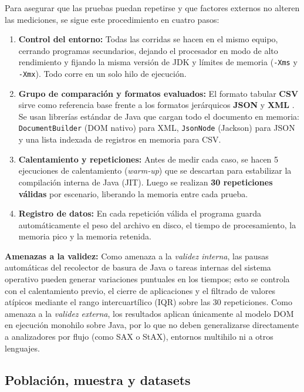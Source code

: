 Para asegurar que las pruebas puedan repetirse y que factores externos no alteren las mediciones, se sigue este procedimiento en cuatro pasos:

\begin{enumerate}
    \item \textbf{Control del entorno:} Todas las corridas se hacen en el mismo equipo, cerrando programas secundarios, dejando el procesador en modo de alto rendimiento y fijando la misma versión de JDK y límites de memoria (\texttt{-Xms} y \texttt{-Xmx}). Todo corre en un solo hilo de ejecución.
    \item \textbf{Grupo de comparación y formatos evaluados:} El formato tabular \textbf{CSV} \cite{shafranovich2005} sirve como referencia base frente a los formatos jerárquicos \textbf{JSON} \cite{bray2017} y \textbf{XML} \cite{bray1998}. Se usan librerías estándar de Java que cargan todo el documento en memoria: \texttt{DocumentBuilder} (DOM nativo) para XML, \texttt{JsonNode} (Jackson) para JSON y una lista indexada de registros en memoria para CSV.
    \item \textbf{Calentamiento y repeticiones:} Antes de medir cada caso, se hacen 5 ejecuciones de calentamiento (\textit{warm-up}) que se descartan para estabilizar la compilación interna de Java (JIT). Luego se realizan \textbf{30 repeticiones válidas} por escenario, liberando la memoria entre cada prueba.
    \item \textbf{Registro de datos:} En cada repetición válida el programa guarda automáticamente el peso del archivo en disco, el tiempo de procesamiento, la memoria pico y la memoria retenida.
\end{enumerate}

\textbf{Amenazas a la validez:} Como amenaza a la \textit{validez interna}, las pausas automáticas del recolector de basura de Java o tareas internas del sistema operativo pueden generar variaciones puntuales en los tiempos; esto se controla con el calentamiento previo, el cierre de aplicaciones y el filtrado de valores atípicos mediante el rango intercuartílico (IQR) sobre las 30 repeticiones. Como amenaza a la \textit{validez externa}, los resultados aplican únicamente al modelo DOM en ejecución monohilo sobre Java, por lo que no deben generalizarse directamente a analizadores por flujo (como SAX o StAX), entornos multihilo ni a otros lenguajes.

\subsection{Población, muestra y datasets}

